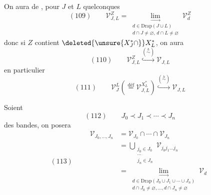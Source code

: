 On aura de \unsure{$=$}, pour $J$ et $L$ quelconques
\[(109)\qquad\mathcal V_{J,L}^Z=\underset{\substack{d\in\mathrm{Drap}(J\cup L)\\d\cap J\ne\varnothing,\,d\cap L\ne\varnothing}}{\lim_{\longrightarrow}}\mathcal V_d^Z\]
donc si  $Z$ contient $\deleted{\unsure{X_J^*\cap}}X_L^*$, on aura
\[(110)\qquad\mathcal V_{J,L}^Z\overset{(\overset h\sim)}{\hookrightarrow}\mathcal V_{J,L}\]
en particulier
\[(111)\qquad\mathcal V_J^L\left(\overset{\mathrm{déf}}=\mathcal V_{J,L}^{X_L^*}\right)\overset{(\overset h\sim)}{\hookrightarrow}\mathcal V_{J,L}\]

Soient
\[(112)\qquad J_0\prec J_1\prec\cdots\prec J_n\]
des bandes, on posera
\[
(113)\qquad\begin{aligned}
\mathcal V_{J_0,\ldots,J_n}&=\mathcal V_{J_0}\cap\cdots\cap\mathcal V_{J_n}\\
&=\bigcup_{\substack{j_0\in J_0\\\cdots\\j_n\in J_n}}\mathcal V_{j_0j_1\ldots j_n}\\
&=\underset{\substack{d\in\mathrm{Drap}(J_0\cup J_1\cup\cdots\cup J_n)\\d\cap J_0\ne\varnothing,\ldots,d\cap J_n\ne\varnothing}}{\lim_{\longrightarrow}}\mathcal V_d
\end{aligned}
\]
\deleted{\[\begin{aligned}
\unsure{X}&=\unsure{\overline{\mathcal V}_{J}^{L}}\\
&\unsure{Z\cap\mathcal V_J}\\
&=\unsure{X^*\cup\mathcal V_{J\cup L}\cap\mathcal V_L^*}
\end{aligned}\]}

